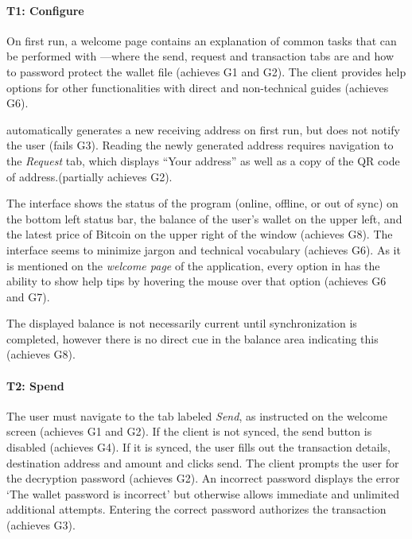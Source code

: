 \paragraph{T1: Configure} On first run, a welcome page contains an explanation of common tasks that can be performed with \multibit---where the send, request and transaction tabs are and how to password protect the wallet file (achieves G1 and G2). The client provides help options for other functionalities with direct and non-technical guides (achieves G6). 

\multibit automatically generates a new receiving address on first run, but does not notify the user (fails G3). Reading the newly generated address requires navigation to the \emph{Request} tab, which displays ``Your address'' as well as a copy of the QR code of address.(partially achieves G2).

The interface shows the status of the program (online, offline, or out of sync) on the bottom left status bar, the balance of the user's wallet on the upper left, and the latest price of Bitcoin on the upper right of the window (achieves G8). The interface seems to minimize jargon and technical vocabulary (achieves G6). As it is mentioned on the \emph{welcome page} of the application, every option in \multibit has the ability to show help tips by hovering the mouse over that option (achieves G6 and G7).

The displayed balance is not necessarily current until synchronization is completed, however there is no direct cue in the balance area indicating this (achieves G8).

\paragraph{T2: Spend} The user must navigate to the tab labeled \emph{Send}, as instructed on the welcome screen (achieves G1 and G2). If the client is not synced, the send button is disabled (achieves G4). If it is synced, the user fills out the transaction details, destination address and amount and clicks send. The client prompts the user for the decryption password (achieves G2). An incorrect password displays the error `The wallet password is incorrect' but otherwise allows immediate and unlimited additional attempts. Entering the correct password authorizes the transaction (achieves G3).


